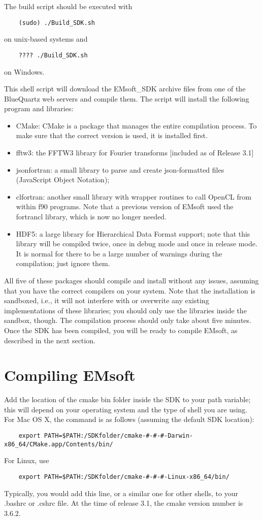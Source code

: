 \documentclass[DIV=calc, paper=letter, fontsize=11pt]{scrartcl}	 %
\newcommand{\ctp}{\textsf{EMsoft}}
\newcommand{\ctpb}{\textbf{\textsf{EMsoft}}}
\begin{document}
The build script should be executed with
\begin{verbatim}
	(sudo) ./Build_SDK.sh
\end{verbatim}
on unix-based systems and
\begin{verbatim}
	???? ./Build_SDK.sh
\end{verbatim}
on Windows.

This shell script will download the \textsf{EMsoft\_SDK} archive files from one of the BlueQuartz web servers and compile
them. The script will install the following program and libraries:
\begin{itemize}
\item \textsf{CMake}: CMake is a package that manages the entire compilation process.  To make sure that the correct version is used, it is installed first.
\item \textsf{fftw3}: the FFTW3 library for Fourier transforms [included as of Release 3.1]
\item \textsf{jsonfortran}: a small library to parse and create json-formatted files (JavaScript Object Notation);
\item \textsf{clfortran}: another small library with wrapper routines to call OpenCL from within f90 programs.  Note that a previous version of EMsoft used 
the fortrancl library, which is now no longer needed.
\item \textsf{HDF5}: a large library for Hierarchical Data Format support; note that this library will be compiled twice, once in debug mode and once in release mode.
It is normal for there to be a large number of warnings during the compilation; just ignore them.
\end{itemize}
All five of these packages should compile and install without any issues, assuming that you have the correct compilers on your system.  Note that the 
installation is sandboxed, i.e., it will not interfere with or overwrite any existing implementations of these libraries;  you should only use the libraries
inside the sandbox, though.  The compilation process should only take about five minutes.  Once the SDK has been compiled, you will be ready to compile \ctp, 
as described in the next section.

\section{Compiling \ctpb\label{sec:compile}}
Add the location of the cmake bin folder inside the SDK to your path variable; this will depend on your operating system and the type 
of shell you are using.  For Mac OS X, the command is as follows (assuming the default SDK location):
\begin{verbatim}
	export PATH=$PATH:/SDKfolder/cmake-#-#-#-Darwin-x86_64/CMake.app/Contents/bin/
\end{verbatim}
For Linux, use
\begin{verbatim}
	export PATH=$PATH:/SDKfolder/cmake-#-#-#-Linux-x86_64/bin/
\end{verbatim}
Typically, you would add this line, or a similar one for other shells, to your \textsf{.bashrc} or \textsf{.cshrc} file. At the time of release 3.1, the cmake version 
number is 3.6.2.
\end{document}
